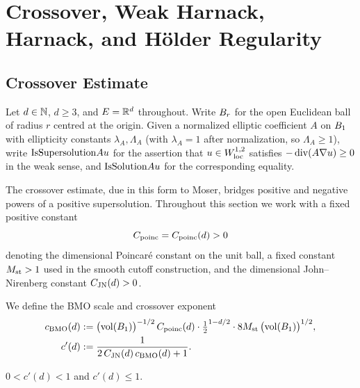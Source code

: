 \chapter{Crossover, Weak Harnack, Harnack, and H\"older Regularity}\label{sec:crossover}

\section{Crossover Estimate}

Let $d \in \mathbb{N}$, $d \geq 3$, and $E = \mathbb{R}^d$ throughout. Write $B_{r}$ for the
open Euclidean ball of radius $r$ centred at the origin. Given a normalized
elliptic coefficient $A$ on $B_{1}$ with ellipticity constants $\lambda_A,
\Lambda_A$ (with $\lambda_A = 1$ after normalization, so $\Lambda_A \geq 1$),
write $\mathrm{IsSupersolution}{A}{u}$ for the assertion that $u \in W^{1,2}_{\mathrm{loc}}$
satisfies $-\operatorname{div}(A\nabla u) \geq 0$ in the weak sense, and $\mathrm{IsSolution}{A}{u}$
for the corresponding equality.

The crossover estimate, due in this form to Moser, bridges positive and
negative powers of a positive supersolution. Throughout this section we work
with a fixed positive constant
\begin{equation*}
  C_{\mathrm{poinc}} = C_{\mathrm{poinc}}(d) > 0
\end{equation*}
denoting the dimensional Poincar\'e constant on the unit ball, a fixed
constant $M_{\mathrm{st}} > 1$ used in the smooth cutoff construction, and the
dimensional John--Nirenberg constant $C_{\mathrm{JN}}(d) > 0$.

\begin{definition}
\label{def:c_crossover_bmo_scale}
\leanok
{}
We define the BMO scale and crossover exponent
\begin{align*}
  c_{\mathrm{BMO}}(d) &:= \bigl(\mathrm{vol}(B_{1})\bigr)^{-1/2}\,C_{\mathrm{poinc}}(d) \cdot
    \tfrac12^{1 - d/2} \cdot 8M_{\mathrm{st}} \,\bigl(\mathrm{vol}(B_{1})\bigr)^{1/2}, \\
  c'(d)       &:= \frac{1}{2\,C_{\mathrm{JN}}(d)\,c_{\mathrm{BMO}}(d) + 1}.
\end{align*}
\end{definition}

\begin{lemma}
\label{lem:c-crossover-bounds}
\leanok
{}
$0 < c'(d) < 1$ and $c'(d) \leq 1$.
\end{lemma}

